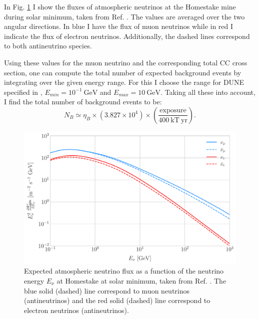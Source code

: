 In Fig. \ref{fig:homestake_fluxes} I show the fluxes of atmospheric neutrinos at the Homestake mine during solar minimum, taken from Ref. \cite{Honda2015}. The values are averaged over the two angular directions. In blue I have the flux of muon neutrinos while in red I indicate the flux of electron neutrinos. Additionally, the dashed lines correspond to both antineutrino species.

Using these values for the muon neutrino and the corresponding total CC cross section, one can compute the total number of expected background events by integrating over the given energy range. For this I choose the range for DUNE specified in \cite{DUNE2020TDR2}, $E_{min} = 10^{-1} \ \mathrm{GeV}$ and $E_{max} = 10 \ \mathrm{GeV}$. Taking all these into account, I find the total number of background events to be:
\begin{equation}\label{4.4}
	N_{B} \simeq  \eta_{B} \times \left(3.827 \times 10^{4}\right) \times \left(\frac{\mathrm{exposure}}{400 \ \mathrm{kT \ yr}}\right).
\end{equation}

\begin{figure}[t]
	\centering
	\includegraphics[width=0.9\linewidth]{Images/DM_Analysis/homestake_fluxes}
	\caption[Expected atmospheric neutrino flux as a function of the neutrino energy $E_{\nu}$ at Homestake at solar minimum.]{Expected atmospheric neutrino flux as a function of the neutrino energy $E_{\nu}$ at Homestake at solar minimum, taken from Ref. \cite{Honda2015}. The blue solid (dashed) line correspond to muon neutrinos (antineutrinos) and the red solid (dashed) line correspond to electron neutrinos (antineutrinos).}
	\label{fig:homestake_fluxes}
\end{figure}

